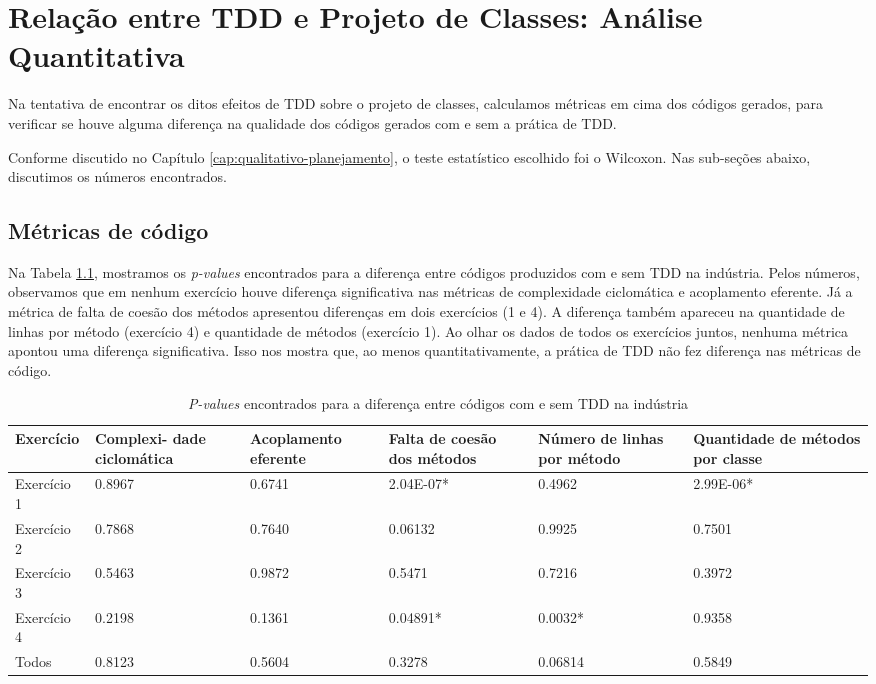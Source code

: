 \chapter{Relação entre TDD e Projeto de Classes: Análise Quantitativa}
\label{cap:analise-quantitativa}

Na tentativa de encontrar os ditos efeitos de TDD sobre o projeto de classes,
calculamos métricas em cima dos códigos gerados, para verificar se houve
alguma diferença na qualidade dos códigos gerados com e sem a prática de TDD.

Conforme discutido no Capítulo \ref{cap:qualitativo-planejamento}, o teste
estatístico escolhido foi o Wilcoxon. 
Nas sub-seções abaixo, discutimos os números encontrados.

\section{Métricas de código}

Na Tabela \ref{metricas-industria}, mostramos os \textit{p-values} encontrados para
a diferença entre códigos produzidos com e sem TDD na indústria. 
Pelos números, 
observamos que em nenhum exercício houve diferença significativa nas métricas
de complexidade ciclomática e acoplamento eferente. Já a métrica de falta
de coesão dos métodos apresentou diferenças em dois exercícios (1 e 4). 
A diferença também apareceu na quantidade de linhas por método (exercício 4)
e quantidade de métodos (exercício 1). Ao olhar os dados de todos os exercícios
juntos, nenhuma métrica apontou uma diferença significativa.
Isso nos mostra que, ao menos quantitativamente, a prática de TDD não fez
diferença nas métricas de código.

\begin{table}[h!]
	\centering
	\begin{tabular}{ | p{3cm} | p{2cm} | p{2cm} | p{2cm} | p{2cm} | p{2cm} |}
		\hline
		\textbf{Exercício} & \textbf{Complexi-} \textbf{dade ciclomática} & \textbf{Acoplamento eferente} & \textbf{Falta de coesão dos métodos} & \textbf{Número de linhas por método} 
		& \textbf{Quantidade de métodos por classe} \\
		\hline
		Exercício 1 &	0.8967	&	0.6741 &	\cellcolor[gray]{0.8}2.04E-07* &	0.4962 &	\cellcolor[gray]{0.8}2.99E-06* \\
		Exercício 2	& 0.7868	&	0.7640 &	0.06132 &	0.9925 &	0.7501 \\
		Exercício 3	& 0.5463	&	0.9872 &	0.5471 &	0.7216 &	0.3972\\
		Exercício 4	& 0.2198	&	0.1361 &	\cellcolor[gray]{0.8}0.04891* &	\cellcolor[gray]{0.8}0.0032* &	0.9358\\
		\hline
		Todos &	0.8123	&	0.5604 &	0.3278 &	0.06814 &	0.5849\\
		\hline
	\end{tabular}
	\caption{\textit{P-values} encontrados para a diferença entre códigos com e sem TDD na indústria}
	\label{metricas-industria}
\end{table}

